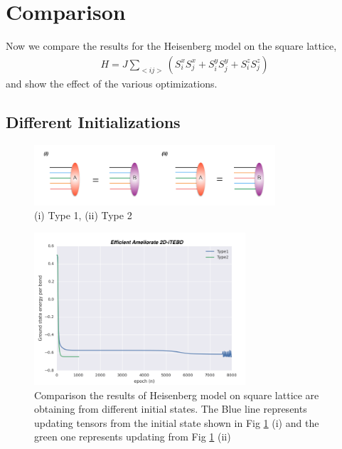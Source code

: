 \section{Comparison} 
\label{Comparison}

Now we compare the results for the Heisenberg model on the square lattice,
\begin{align}
	H = J \sum_{<ij>}{\left( S^{x}_{i}S^{x}_{j}+S^{y}_{i}S^{y}_{j}+S^{z}_{i}S^{z}_{j} \right)}
\end{align}
and show the effect of the various optimizations.

\subsection{Different Initializations}

\begin{figure}[!ht]
	\centering
	\includegraphics[width=0.8\textwidth]{figures/fig322.png}
	\caption[Different methods to initialize the states]{(i) Type 1, (ii) Type 2}
	\label{fig322}
\end{figure}

\begin{figure}[!hb]
	\centering
	\includegraphics[width=0.7\textwidth]{figures/fig323.png}
	\caption[Comparison the results of Heisenberg model on square lattice which are obtaining from different initial states.]{Comparison the results of Heisenberg model on square lattice are obtaining from different initial states. The Blue line represents updating tensors from the initial state shown in Fig \ref{fig322} (i) and the green one represents updating from Fig \ref{fig322} (ii)}

	\label{fig323}
\end{figure}

